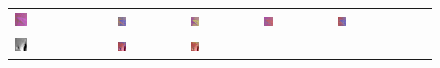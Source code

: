 \begin{figure}[h!]
\begin{tabular}{C{0.14\textwidth}C{0.14\textwidth}C{0.14\textwidth}C{0.14\textwidth}C{0.14\textwidth}C{0.14\textwidth}C{0.14\textwidth}}
		\includegraphics[width=0.14\textwidth]{images/gen/color_weight/p03_03.png_0.33.png} &
		\includegraphics[width=0.14\textwidth]{images/gen/color_weight/p03_03.png_0.66.png} &
		\includegraphics[width=0.14\textwidth]{images/gen/color_weight/p03_03.png_1.00.png} &
		\includegraphics[width=0.14\textwidth]{images/gen/color_weight/p03_03.png_1.33.png} &
		\includegraphics[width=0.14\textwidth]{images/gen/color_weight/p03_03.png_1.66.png} \\
		\includegraphics[width=0.14\textwidth]{images/p03/p03_04.png} &
		\includegraphics[width=0.14\textwidth]{images/gen/color_weight/p03_04.png_0.00.png} &
		\includegraphics[width=0.14\textwidth]{images/gen/color_weight/p03_04.png_0.33.png} &

\end{tabular}
\end{figure}
